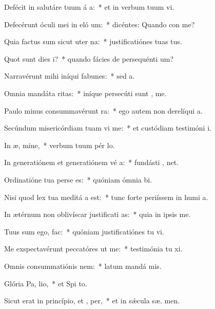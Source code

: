 \item Defécit in salutáre tuum á a:~* et in verbum tuum vi.
\item Defecérunt óculi mei in eló um:~* dicéntes: Quando con me?
\item Quia factus sum sicut uter  na:~* justificatiónes tuas   tus.
\item Quot sunt dies  i?~* quando fácies de persequénti  um?
\item Narravérunt mihi iníqui fabunes:~* sed    a.
\item Omnia mandáta  ritas:~* iníque persecúti sunt ,  me.
\item Paulo minus consummavérunt   ra:~* ego autem non derelíqui  a.
\item Secúndum misericórdiam tuam vi me:~* et custódiam testimóni  i.
\item In æ, mine,~* verbum tuum pér  lo.
\item In generatiónem et generatiónem vé a:~* fundásti ,  net.
\item Ordinatióne tua perse es:~* quóniam ómnia  bi.
\item Nisi quod lex tua meditá a est:~* tunc forte periíssem in humi a.
\item In ætérnum non oblivíscar justificati as:~* quia in ipsis  me.
\item Tuus sum ego,   fac:~* quóniam justificatiónes tu vi.
\item Me exspectavérunt peccatóres ut  me:~* testimónia tu xi.
\item Omnis consummatiónis  nem:~* latum mandá  mis.
\item Glória Pa,  lio,~* et Spi to.
\item Sicut erat in princípio, et ,  per,~* et in sǽcula sæ. men.
